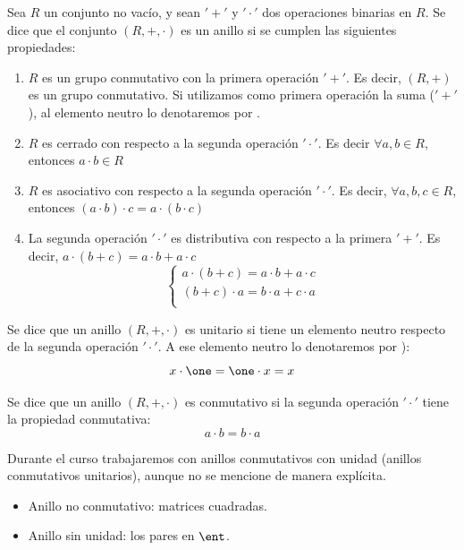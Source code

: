 \begin{defn}[Anillo] \label{def:Anillo}
Sea $R$ un conjunto no vacío, y sean $'+'$ y $'\cdot'$ dos operaciones binarias en $R$. Se dice que el conjunto $(R, +, \cdot )$ es un anillo si se cumplen las siguientes propiedades:

\begin{enumerate}
	\item $R$ es un grupo conmutativo con la primera operación $'+'$. Es decir, $(R,+)$ es un grupo conmutativo. Si utilizamos como primera operación la suma ($'+'$), al elemento neutro lo denotaremos por \zero.
	\item $R$ es cerrado con respecto a la segunda operación $'\cdot'$. Es decir $\forall a,b \in R$, entonces $a \cdot b \in R$
	\item $R$ es asociativo con respecto a la segunda operación $'\cdot'$. Es decir, $\forall a,b,c \in R$, entonces $(a\cdot b) \cdot c = a \cdot (b \cdot c)$
	\item La segunda operación $'\cdot'$ es distributiva con respecto a la primera $'+'$. Es decir, $a \cdot (b+c) = a\cdot b + a \cdot c$
	\[
	\left\{ \begin{array}{c}
	a \cdot (b+c) = a\cdot b + a \cdot c \\
	(b+c) \cdot a = b\cdot a + c\cdot a \\
	\end{array}
	\right.
	\]
\end{enumerate}
\end{defn}


\begin{defn}
	Se dice que un anillo $(R, +, \cdot)$ es unitario si tiene un elemento neutro respecto de la segunda operación $'\cdot'$. A ese elemento neutro lo denotaremos por \one):
	\[ x\cdot \one = \one \cdot x = x \]
\end{defn}

\begin{defn}
Se dice que un anillo $(R, +, \cdot)$ es conmutativo si la segunda operación $'\cdot'$ tiene la propiedad conmutativa:
\[ a\cdot b = b\cdot a \]
\end{defn}


\nota Durante el curso trabajaremos con anillos conmutativos con unidad (anillos conmutativos unitarios), aunque no se mencione de manera explícita.

\begin{example}
\begin{itemize}
	\item Anillo no conmutativo: matrices cuadradas.
	\item Anillo sin unidad: los pares en $\ent$.
\end{itemize}
\end{example}


